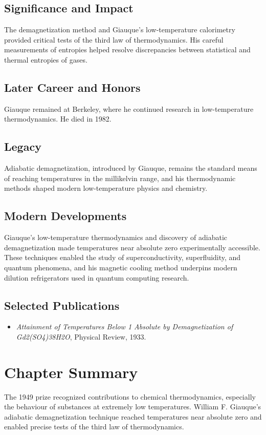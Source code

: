 \subsection*{Significance and Impact}

The demagnetization method and Giauque's low-temperature calorimetry provided critical tests of the third law of thermodynamics. His careful measurements of entropies helped resolve discrepancies between statistical and thermal entropies of gases.

\subsection*{Later Career and Honors}

Giauque remained at Berkeley, where he continued research in low-temperature thermodynamics. He died in 1982.

\subsection*{Legacy}

Adiabatic demagnetization, introduced by Giauque, remains the standard means of reaching temperatures in the millikelvin range, and his thermodynamic methods shaped modern low-temperature physics and chemistry.

\subsection*{Modern Developments}

Giauque's low-temperature thermodynamics and discovery of adiabatic demagnetization made temperatures near absolute zero experimentally accessible. These techniques enabled the study of superconductivity, superfluidity, and quantum phenomena, and his magnetic cooling method underpins modern dilution refrigerators used in quantum computing research.

\subsection*{Selected Publications}

\begin{itemize}

\item \emph{Attainment of Temperatures Below 1\textdegree{} Absolute by Demagnetization of Gd2(SO4)3\textperiodcentered 8H2O}, Physical Review, 1933.

\end{itemize}

\clearpage

\section*{Chapter Summary}

The 1949 prize recognized contributions to chemical thermodynamics, especially the behaviour of substances at extremely low temperatures. William F. Giauque's adiabatic demagnetization technique reached temperatures near absolute zero and enabled precise tests of the third law of thermodynamics.
